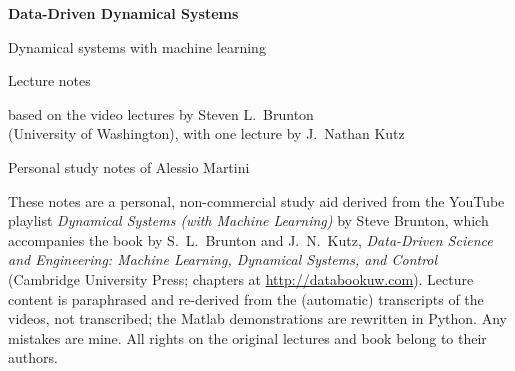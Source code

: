 \documentclass[12pt,oneside,openany]{book}
\begin{document}
\frontmatter
\begin{titlepage}
  \centering
  \vspace*{3cm}
  {\Huge\bfseries Data-Driven Dynamical Systems\par}
  \vspace{0.4cm}
  {\LARGE Dynamical systems with machine learning\par}
  \vspace{1cm}
  {\Large Lecture notes\par}
  \vspace{0.5cm}
  {\large based on the video lectures by Steven L.~Brunton\\(University of Washington), with one
  lecture by J.~Nathan Kutz\par}
  \vspace{2cm}
  {\large Personal study notes of Alessio Martini\par}
  \vfill
  \begin{minipage}{0.85\textwidth}\small
    These notes are a personal, non-commercial study aid derived from the YouTube playlist
    \emph{Dynamical Systems (with Machine Learning)} by Steve Brunton, which accompanies the book
    by S.~L.~Brunton and J.~N.~Kutz, \emph{Data-Driven Science and Engineering: Machine Learning,
    Dynamical Systems, and Control} (Cambridge University Press; chapters at
    \url{http://databookuw.com}). Lecture content is paraphrased and re-derived from the (automatic)
    transcripts of the videos, not transcribed; the Matlab demonstrations are rewritten in Python.
    Any mistakes are mine. All rights on the original lectures and book belong to their authors.
  \end{minipage}
  \vspace{1cm}
\end{titlepage}
\end{document}
